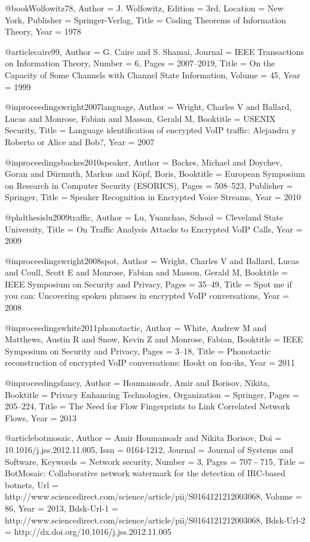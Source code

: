 {{@book{Wolfowitz78,
	Author = {J. Wolfowitz},
	Edition = {3rd},
	Location = {New York},
	Publisher = {Springer-Verlag},
	Title = {Coding Theorems of Information Theory},
	Year = 1978}

@article{caire99,
	Author = {G. Caire and S. Shamai},
	Journal = {IEEE Transactions on Information Theory},
	Number = {6},
	Pages = {2007--2019},
	Title = {On the Capacity of Some Channels with Channel State Information},
	Volume = {45},
	Year = {1999}}

@inproceedings{wright2007language,
	Author = {Wright, Charles V and Ballard, Lucas and Monrose, Fabian and Masson, Gerald M},
	Booktitle = {USENIX Security},
	Title = {{Language identification of encrypted VoIP traffic: Alejandra y Roberto or Alice and Bob?}},
	Year = {2007}}

@inproceedings{backes2010speaker,
	Author = {Backes, Michael and Doychev, Goran and D{\"u}rmuth, Markus and K{\"o}pf, Boris},
	Booktitle = {{European Symposium on Research in Computer Security (ESORICS)}},
	Pages = {508--523},
	Publisher = {Springer},
	Title = {{Speaker Recognition in Encrypted Voice Streams}},
	Year = {2010}}

@phdthesis{lu2009traffic,
	Author = {Lu, Yuanchao},
	School = {Cleveland State University},
	Title = {{On Traffic Analysis Attacks to Encrypted VoIP Calls}},
	Year = {2009}}

@inproceedings{wright2008spot,
	Author = {Wright, Charles V and Ballard, Lucas and Coull, Scott E and Monrose, Fabian and Masson, Gerald M},
	Booktitle = {IEEE Symposium on Security and Privacy},
	Pages = {35--49},
	Title = {Spot me if you can: Uncovering spoken phrases in encrypted VoIP conversations},
	Year = {2008}}

@inproceedings{white2011phonotactic,
	Author = {White, Andrew M and Matthews, Austin R and Snow, Kevin Z and Monrose, Fabian},
	Booktitle = {IEEE Symposium on Security and Privacy},
	Pages = {3--18},
	Title = {Phonotactic reconstruction of encrypted VoIP conversations: Hookt on fon-iks},
	Year = {2011}}

@inproceedings{fancy,
	Author = {Houmansadr, Amir and Borisov, Nikita},
	Booktitle = {Privacy Enhancing Technologies},
	Organization = {Springer},
	Pages = {205--224},
	Title = {The Need for Flow Fingerprints to Link Correlated Network Flows},
	Year = {2013}}

@article{botmosaic,
	Author = {Amir Houmansadr and Nikita Borisov},
	Doi = {10.1016/j.jss.2012.11.005},
	Issn = {0164-1212},
	Journal = {Journal of Systems and Software},
	Keywords = {Network security},
	Number = {3},
	Pages = {707 - 715},
	Title = {BotMosaic: Collaborative network watermark for the detection of IRC-based botnets},
	Url = {http://www.sciencedirect.com/science/article/pii/S0164121212003068},
	Volume = {86},
	Year = {2013},
	Bdsk-Url-1 = {http://www.sciencedirect.com/science/article/pii/S0164121212003068},
	Bdsk-Url-2 = {http://dx.doi.org/10.1016/j.jss.2012.11.005}}

}}
